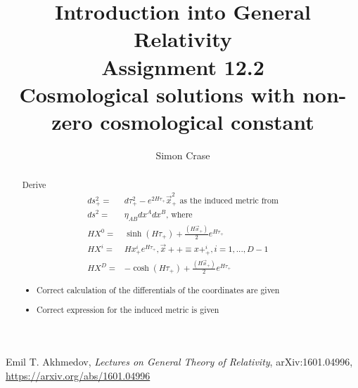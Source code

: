 \documentclass[]{article}
\title{Introduction into General Relativity\\Assignment 12.2\\Cosmological solutions with non-zero cosmological constant}
\author{Simon Crase}
\begin{document}
\maketitle

\begin{abstract}
Derive 
\begin{align*}
ds^2_+=&d\tau^2_+ - e^{2H\tau_+}\vec{x}^2_+\text{ as the induced metric from}\\
ds^2=&\eta_{AB}dx^Adx^B\text{, where}\\
HX^0=&\sinh(H\tau_+)+\frac{(H\vec{x}_+)}{2}e^{H\tau_+}\\
HX^i=&Hx^i_+e^{H\tau_+}, \vec{x}++\equiv x+^i_+, i=1,...,D-1\\
HX^D=&-\cosh(H\tau_+)+\frac{(H\vec{x}_+)}{2}e^{H\tau_+}
\end{align*}
\begin{itemize}
	\item     Correct calculation of the differentials of the coordinates are given
	\item Correct expression for the induced metric is given
\end{itemize}
\end{abstract}

\section{}

\begin{thebibliography}{9}\label{section:biblio}
	\raggedright
	Emil T. Akhmedov,
	\emph{Lectures on General Theory of Relativity},
	arXiv:1601.04996,
	\url{https://arxiv.org/abs/1601.04996}
\end{thebibliography}
\end{document}
